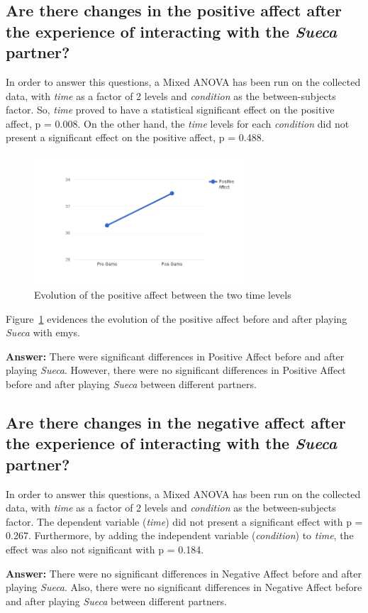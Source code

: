 \subsection*{Are there changes in the positive affect after the experience of interacting with the \emph{Sueca} partner?}
In order to answer this questions, a Mixed ANOVA has been run on the collected data, with \emph{time} as a factor of 2 levels and \emph{condition} as the between-subjects factor.
So, \emph{time} proved to have a statistical significant effect on the positive affect, p = 0.008.
On the other hand, the \emph{time} levels for each \emph{condition} did not present a significant effect on the positive affect, p = 0.488.

\begin{figure}[h!]
  \centering
    \includegraphics[width=0.7\textwidth]{./img/7/positiveAffect}
  \caption{Evolution of the positive affect between the two time levels}
\label{fig:positiveAffect}
\end{figure}

Figure~\ref{fig:positiveAffect} evidences the evolution of the positive affect before and after playing \emph{Sueca} with \ac{emys}.

\textbf{Answer:} There were significant differences in Positive Affect before and after playing \emph{Sueca}.
However, there were no significant differences in Positive Affect before and after playing \emph{Sueca} between different partners.

\subsection*{Are there changes in the negative affect after the experience of interacting with the \emph{Sueca} partner?}
In order to answer this questions, a Mixed ANOVA has been run on the collected data, with \emph{time} as a factor of 2 levels and \emph{condition} as the between-subjects factor.
The dependent variable (\emph{time}) did not present a significant effect with p = 0.267.
Furthermore, by adding the independent variable (\emph{condition}) to \emph{time}, the effect was also not significant with p = 0.184.

\textbf{Answer:} There were no significant differences in Negative Affect before and after playing \emph{Sueca}.
Also, there were no significant differences in Negative Affect before and after playing \emph{Sueca} between different partners.

\clearpage
